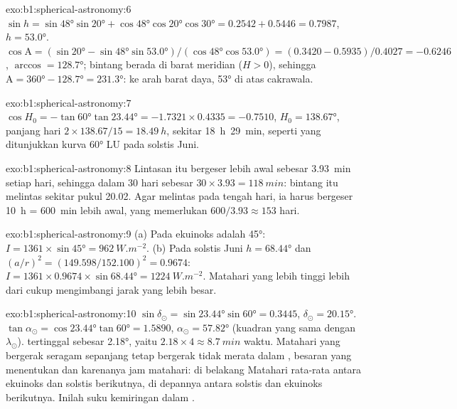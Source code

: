 \begin{solution}{exo:b1:spherical-astronomy:6}
$\sin h = \sin\ang{48}\sin\ang{20} + \cos\ang{48}\cos\ang{20}\cos\ang{30}
= 0.2542 + 0.5446 = 0.7987$, $h = \ang{53.0}$.
$\cos\mathrm{A} = (\sin\ang{20} - \sin\ang{48}\sin\ang{53.0})/(\cos\ang{48}
\cos\ang{53.0}) = (0.3420 - 0.5935)/0.4027 = -0.6246$, $\arccos = \ang{128.7}$;
bintang berada di barat meridian ($H > 0$), sehingga $\mathrm{A} = \ang{360} -
\ang{128.7} = \ang{231.3}$: ke arah barat daya, \ang{53} di atas cakrawala.
\end{solution}

\begin{solution}{exo:b1:spherical-astronomy:7}
$\cos H_0 = -\tan\ang{60}\tan\ang{23.44} = -1.7321\times0.4335 = -0.7510$,
$H_0 = \ang{138.67}$, panjang hari $2\times138.67/15 = \qty{18.49}{h}$, sekitar
\qty{18}{h}~\qty{29}{min}, seperti yang ditunjukkan kurva \ang{60} LU pada solstis Juni.
\end{solution}

\begin{solution}{exo:b1:spherical-astronomy:8}
Lintasan itu bergeser lebih awal sebesar \qty{3.93}{min} setiap hari, sehingga dalam 30 hari sebesar $30\times3.93 =
\qty{118}{min}$: bintang itu melintas sekitar pukul 20.02. Agar melintas pada tengah hari, ia harus bergeser \qty{10}{h} = \qty{600}{min} lebih awal, yang memerlukan
$600/3.93 \approx 153$ hari.
\end{solution}

\begin{solution}{exo:b1:spherical-astronomy:9}
(a) Pada ekuinoks  adalah \ang{45}: $I = 1361\times\sin\ang{45}
= \qty{962}{W.m^{-2}}$. (b) Pada solstis Juni $h = \ang{68.44}$ dan
$(a/r)^2 = (149.598/152.100)^2 = 0.9674$:
$I = 1361\times0.9674\times\sin\ang{68.44} = \qty{1224}{W.m^{-2}}$. Matahari yang
lebih tinggi lebih dari cukup mengimbangi jarak yang lebih besar.
\end{solution}

\begin{solution}{exo:b1:spherical-astronomy:10}
$\sin\delta_\odot = \sin\ang{23.44}\sin\ang{60} = 0.3445$,
$\delta_\odot = \ang{20.15}$. $\tan\alpha_\odot = \cos\ang{23.44}\tan\ang{60}
= 1.5890$, $\alpha_\odot = \ang{57.82}$ (kuadran yang sama dengan $\lambda_\odot$).
 tertinggal sebesar \ang{2.18}, yaitu $2.18\times4 \approx
\qty{8.7}{min}$ waktu. Matahari yang bergerak seragam sepanjang  tetap bergerak tidak merata dalam , besaran yang menentukan  dan karenanya jam matahari: di belakang Matahari rata-rata antara ekuinoks dan solstis berikutnya, di depannya antara solstis dan ekuinoks berikutnya. Inilah suku kemiringan dalam .
\end{solution}

